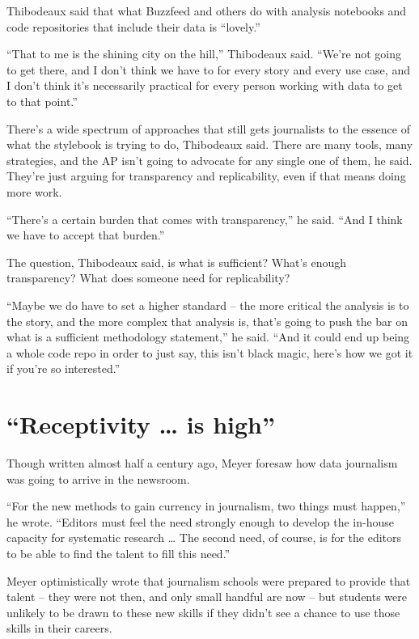 \documentclass[
  letterpaper,
  DIV=11,
  numbers=noendperiod]{scrreprt}
\begin{document}
Thibodeaux said that what Buzzfeed and others do with analysis notebooks
and code repositories that include their data is ``lovely.''

``That to me is the shining city on the hill,'' Thibodeaux said. ``We're
not going to get there, and I don't think we have to for every story and
every use case, and I don't think it's necessarily practical for every
person working with data to get to that point.''

There's a wide spectrum of approaches that still gets journalists to the
essence of what the stylebook is trying to do, Thibodeaux said. There
are many tools, many strategies, and the AP isn't going to advocate for
any single one of them, he said. They're just arguing for transparency
and replicability, even if that means doing more work.

``There's a certain burden that comes with transparency,'' he said.
``And I think we have to accept that burden.''

The question, Thibodeaux said, is what is sufficient? What's enough
transparency? What does someone need for replicability?

``Maybe we do have to set a higher standard -- the more critical the
analysis is to the story, and the more complex that analysis is, that's
going to push the bar on what is a sufficient methodology statement,''
he said. ``And it could end up being a whole code repo in order to just
say, this isn't black magic, here's how we got it if you're so
interested.''

\hypertarget{receptivity-is-high}{%
\section{``Receptivity \ldots{} is high''}\label{receptivity-is-high}}

Though written almost half a century ago, Meyer foresaw how data
journalism was going to arrive in the newsroom.

``For the new methods to gain currency in journalism, two things must
happen,'' he wrote. ``Editors must feel the need strongly enough to
develop the in-house capacity for systematic research \ldots{} The
second need, of course, is for the editors to be able to find the talent
to fill this need.''

Meyer optimistically wrote that journalism schools were prepared to
provide that talent -- they were not then, and only small handful are
now -- but students were unlikely to be drawn to these new skills if
they didn't see a chance to use those skills in their careers.
\end{document}
